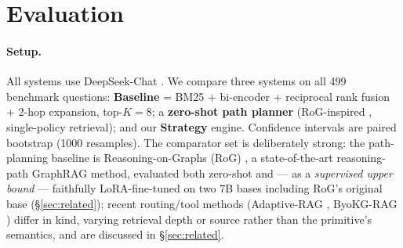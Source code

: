 \documentclass[review]{elsarticle}
\begin{document}
\section{Evaluation}
\label{sec:eval}

\paragraph{Setup.} All systems use DeepSeek-Chat \citep{deepseekv3_2024}. We
compare three systems on all 499 benchmark questions: \textbf{Baseline} =
BM25 \citep{robertson2009bm25} + bi-encoder \citep{xiao2024bge} + reciprocal
rank fusion \citep{cormack2009rrf} + 2-hop expansion, top-$K{=}8$; a
\textbf{zero-shot path planner} (RoG-inspired \citep{luo2024rog}, single-policy
retrieval); and our \textbf{Strategy} engine. Confidence intervals are paired
bootstrap (1000 resamples). The comparator set is deliberately strong: the
path-planning baseline is Reasoning-on-Graphs (RoG) \citep{luo2024rog}, a
state-of-the-art reasoning-path GraphRAG method, evaluated both zero-shot and
--- as a \emph{supervised upper bound} --- faithfully LoRA-fine-tuned on two 7B
bases including RoG's original base (\S\ref{sec:related}); recent routing/tool
methods (Adaptive-RAG \citep{jeong2024adaptiverag}, ByoKG-RAG
\citep{byokgrag2025}) differ in kind, varying retrieval depth or source rather
than the primitive's semantics, and are discussed in \S\ref{sec:related}.
\end{document}
